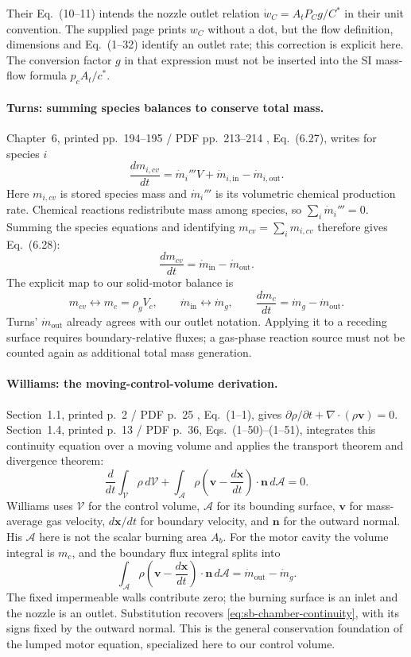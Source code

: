Their Eq.~(10--11) intends the nozzle outlet relation
$\dot w_C=A_tP_Cg/C^*$ in their unit convention. The supplied page
prints $w_C$ without a dot, but the flow definition, dimensions and
Eq.~(1--32) identify an outlet rate; this correction is explicit here.
The conversion factor $g$ in that expression must not be inserted
into the SI mass-flow formula $p_cA_t/c^*$.

\paragraph{Turns: summing species balances to conserve total mass.}
Chapter~6, printed pp.~194--195 / PDF pp.~213--214
\cite{turns}, Eq.~(6.27), writes for species $i$
\[
 \frac{dm_{i,cv}}{dt}
 =\dot m_i'''V+\dot m_{i,\mathrm{in}}-\dot m_{i,\mathrm{out}}.
\]
Here $m_{i,cv}$ is stored species mass and $\dot m_i'''$ is its
volumetric chemical production rate. Chemical reactions redistribute
mass among species, so $\sum_i\dot m_i'''=0$. Summing the species
equations and identifying $m_{cv}=\sum_i m_{i,cv}$ therefore gives
Eq.~(6.28):
\[
 \frac{dm_{cv}}{dt}=\dot m_{\mathrm{in}}-\dot m_{\mathrm{out}}.
\]
The explicit map to our solid-motor balance is
\[
 m_{cv}\longleftrightarrow m_c=\rho_gV_c,\qquad
 \dot m_{\mathrm{in}}\longleftrightarrow\dot m_g,\qquad
 \frac{dm_c}{dt}=\dot m_g-\dot m_{\mathrm{out}}.
\]
Turns' $\dot m_{\mathrm{out}}$ already agrees with our outlet notation. Applying it to a receding
surface requires boundary-relative fluxes; a gas-phase reaction source
must not be counted again as additional total mass generation.

\paragraph{Williams: the moving-control-volume derivation.}
Section~1.1, printed p.~2 / PDF p.~25 \cite{williams},
Eq.~(1--1), gives
$\partial\rho/\partial t+\nabla\cdot(\rho\mathbf v)=0$.
Section~1.4, printed p.~13 / PDF p.~36, Eqs.~(1--50)--(1--51),
integrates this continuity equation over a moving volume and applies
the transport theorem and divergence theorem:
\[
 \frac{d}{dt}\int_{\mathcal V}\rho\,d\mathcal V
 +\int_{\mathcal A}\rho
   \left(\mathbf v-\frac{d\mathbf x}{dt}\right)
   \cdot\mathbf n\,d\mathcal A=0.
\]
Williams uses $\mathcal V$ for the control volume, $\mathcal A$ for its
bounding surface, $\mathbf v$ for mass-average gas velocity,
$d\mathbf x/dt$ for boundary velocity, and $\mathbf n$ for the outward
normal. His $\mathcal A$ here is not the scalar burning area $A_b$.
For the motor cavity the volume integral is $m_c$, and the boundary
flux integral splits into
\[
 \int_{\mathcal A}\rho
   \left(\mathbf v-\frac{d\mathbf x}{dt}\right)\cdot\mathbf n\,d\mathcal A
 =\dot m_{\mathrm{out}}-\dot m_g.
\]
The fixed impermeable walls contribute zero; the burning surface is
an inlet and the nozzle is an outlet. Substitution recovers
\eqref{eq:sb-chamber-continuity}, with its signs fixed by the outward
normal. This is the general conservation foundation of the lumped
motor equation, specialized here to our control volume.


